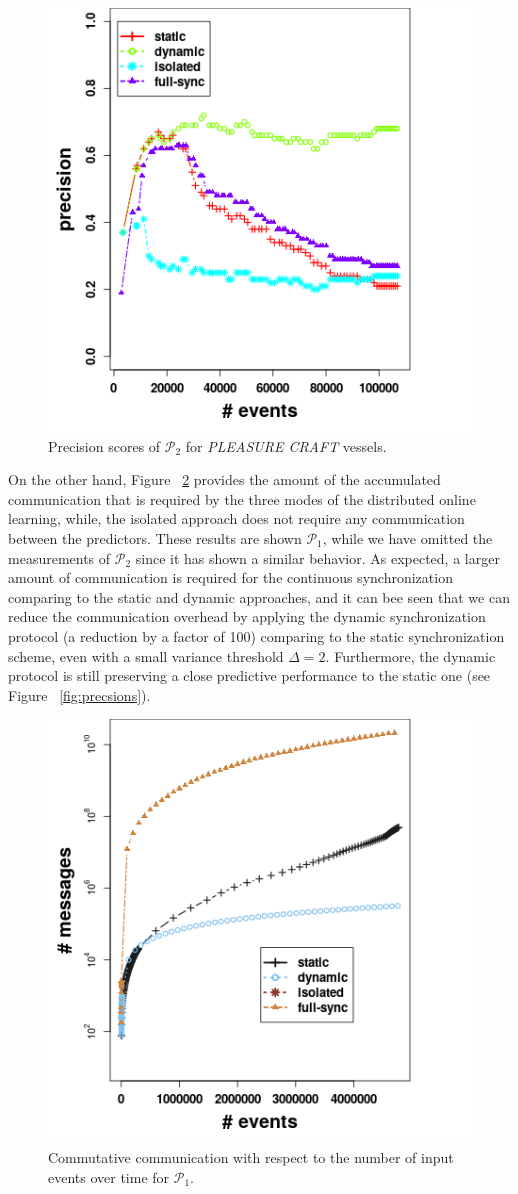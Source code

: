  \begin{figure}[h]
 	
 	\includegraphics[width=.5\textwidth,height=.3\textheight]{figures/precision_p2.png}
 	
 	\caption{Precision scores of $\mathcal{P}_2$  for \textit{PLEASURE CRAFT} vessels.}
 	\label{fig:precsions_p2}
 \end{figure}
 
 
\par On the other hand, Figure ~\ref{fig:comm} provides the amount of the accumulated communication that is required by the three modes of the distributed online learning, while, the isolated approach does not require any communication between the predictors. These results are shown  $\mathcal{P}_1$, while we have omitted the measurements of  $\mathcal{P}_2$ since it has shown a similar behavior.  As expected, a larger amount of communication is required for the continuous synchronization comparing to the static and dynamic approaches, and it can bee seen that we can reduce the communication overhead by applying the dynamic synchronization protocol (a reduction by a factor of 100) comparing to the static synchronization scheme, even with a small variance threshold $\Delta=2$. Furthermore,  the dynamic  protocol is still preserving a close predictive performance to the static one (see Figure ~\ref{fig:precsions}).    


\begin{center}
	
	\begin{figure}[h]
		
		\includegraphics[width=.5\textwidth,height=.3\textheight]{figures/communication.png}
		
		\caption{Commutative communication with respect to the number of input events over time for $\mathcal{P}_1$.}
		\label{fig:comm}
	\end{figure}
\end{center}

